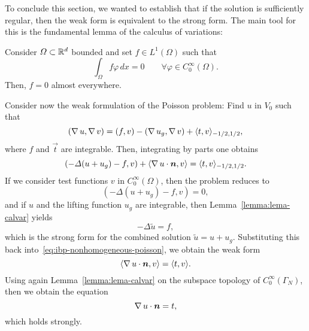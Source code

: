 To conclude this section, we wanted to establish that if the solution is sufficiently regular, then the weak form is equivalent to the strong form. The main tool for this is the fundamental lemma of the calculus of variations: 

\begin{lemma}\label{lemma:lema-calvar}
    Consider $\Omega\subset \mathbb{R}^d$ bounded and set $f\in L^1(\Omega)$ such that
    \begin{equation}\label{eq:lemma-calvar}
        \int_\Omega f\varphi\,dx = 0 \qquad \forall \varphi \in C_0^\infty(\Omega).
    \end{equation}
    Then, $f=0$ almost everywhere.
\end{lemma}

Consider now the weak formulation of the Poisson problem: Find $u$ in $V_0$ such that 
\begin{equation}
    (\operatorname{\nabla} u, \operatorname{\nabla} v) = (f, v) - (\operatorname{\nabla} u_g, \operatorname{\nabla} v) + \langle t, v\rangle_{-1/2, 1/2},
\end{equation}
where $f$ and $\vec t$ are integrable. Then, integrating by parts one obtains
\begin{equation}\label{eq:ibp-nonhomogeneous-poisson}
    (-\Delta (u+u_g) - f, v)+\langle \grad u \cdot \vec n, v\rangle = \langle t, v\rangle_{-1/2,1/2}.
\end{equation}
If we consider test functions $v$ in $C_0^\infty(\Omega)$, then the problem reduces to
\begin{equation}
    (-\Delta (u+u_g) - f, v) = 0,
\end{equation}
and if $u$ and the lifting function $u_g$ are integrable, then Lemma~\ref{lemma:lema-calvar} yields
\begin{equation*}
    -\Delta \tilde u = f,
\end{equation*}
which is the strong form for the combined solution $\tilde u= u + u_g$. Substituting this back into~\ref{eq:ibp-nonhomogeneous-poisson}, we obtain the weak form
\begin{equation*}
    \langle \grad u \cdot \vec n, v\rangle = \langle t, v\rangle.
\end{equation*}
Using again Lemma~\ref{lemma:lema-calvar} on the subspace topology of $C_0^\infty(\Gamma_N)$, then we obtain the equation
\begin{equation*}
    \grad u\cdot \vec n = t,
\end{equation*}
which holds strongly.\\

